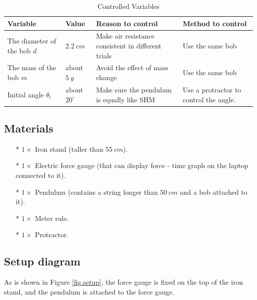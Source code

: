 \documentclass[a4paper]{article}
\newcommand{\grayrow}{\rowcolor[gray]{0.925}}
\begin{document}
\begin{table}[ht]
    \centering
    \caption{Controlled Variables}
    \label{tab.ctrlvar}
    \vspace{0.2cm}
    \begin{tabularx}{\textwidth}{p{2.0cm} p{1.5cm} X X} %
        \hline \hline
        \textbf{Variable} & \textbf{Value} & \textbf{Reason to control} & \textbf{Method to control} \\ \hline
        \grayrow The diameter of the bob $d$ & $\SI{2.2}{cm}$ & Make air resistance consistent in different trials & Use the same bob \\ 
        The mass of the bob $m$ & about $\SI{5}{g}$ & Avoid the effect of mass change & Use the same bob \\ 
        \grayrow Initial angle $\theta_i$ & about $20^\circ$ & Make sure the pendulum is equally like SHM & Use a protractor to control the angle. \\ \hline
    \end{tabularx}
\end{table}

\subsection{Materials}

\begin{itemize}
    \item[*] $1 \times$ Iron stand (taller than $\SI{55}{cm}$).
    \item[*] $1 \times$ Electric force gauge (that can display force - time graph on the laptop connected to it).
    \item[*] $1 \times$ Pendulum (contains a string longer than $\SI{50}{cm}$ and a bob attached to it).
    \item[*] $1 \times$ Meter rule.
    \item[*] $1 \times$ Protractor.
\end{itemize}

\subsection{Setup diagram}

As is shown in Figure \ref{fig.setup}, the force gauge is fixed on the top of the iron stand, and the pendulum is attached to the force gauge.
\end{document}
